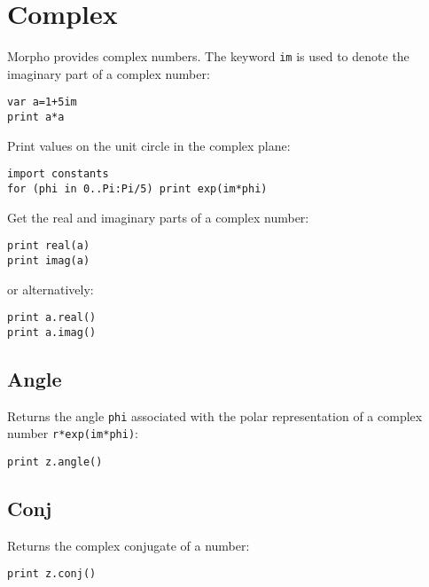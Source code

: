 \hypertarget{complex}{%
\section{Complex}\label{complex}}

Morpho provides complex numbers. The keyword \texttt{im} is used to
denote the imaginary part of a complex number:

\begin{lstlisting}
var a=1+5im 
print a*a
\end{lstlisting}

Print values on the unit circle in the complex plane:

\begin{lstlisting}
import constants 
for (phi in 0..Pi:Pi/5) print exp(im*phi)
\end{lstlisting}

Get the real and imaginary parts of a complex number:

\begin{lstlisting}
print real(a) 
print imag(a) 
\end{lstlisting}

or alternatively:

\begin{lstlisting}
print a.real()
print a.imag() 
\end{lstlisting}

\hypertarget{angle}{%
\subsection{Angle}\label{angle}}

Returns the angle \texttt{phi} associated with the polar representation
of a complex number \texttt{r*exp(im*phi)}:

\begin{lstlisting}
print z.angle() 
\end{lstlisting}

\hypertarget{conj}{%
\subsection{Conj}\label{conj}}

Returns the complex conjugate of a number:

\begin{lstlisting}
print z.conj() 
\end{lstlisting}
